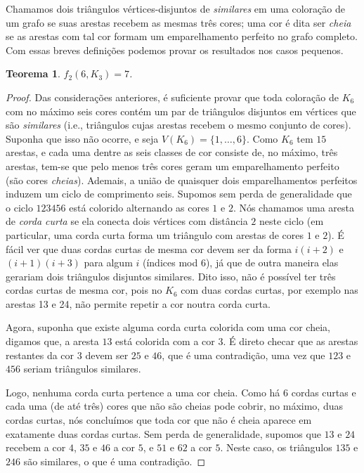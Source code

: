 \documentclass[12pt,a4paper]{book}
\newtheorem{teorema}{Teorema}[chapter]
\begin{document}
Chamamos dois triângulos vértices-disjuntos de \textit{similares} em uma coloração de um grafo se suas arestas recebem as mesmas três cores;  uma cor é dita ser \textit{cheia} se as arestas com tal cor formam um emparelhamento perfeito no grafo completo. 
Com essas breves definições podemos provar os resultados nos casos pequenos.

\begin{teorema}\label{teo:n6K3}
       $f_2(6,K_3)=7$.
\end{teorema}
\begin{proof}
    Das considerações anteriores, é suficiente provar que 
    toda coloração de $K_6$ com no máximo seis cores contém um par de triângulos disjuntos em vértices que são \emph{similares} (i.e., triângulos cujas arestas recebem o mesmo conjunto de cores). 
   Suponha que isso não ocorre, e seja $V(K_6) =\{1,\dots,6\}$.
   Como $K_6$ tem $15$ arestas, e  cada uma dentre as seis classes de cor consiste de, no máximo, três arestas, tem-se que pelo menos três cores geram um emparelhamento perfeito (são cores \emph{cheias}). 
   Ademais, a união de quaisquer dois emparelhamentos perfeitos induzem um ciclo de comprimento seis.
   Supomos sem perda de generalidade que o ciclo $123456$ está colorido alternando as cores $1$ e $2$. 
   Nós chamamos uma aresta de \emph{corda curta} se ela conecta dois vértices com distância $2$ neste ciclo (em particular, uma corda curta forma um triângulo com arestas de cores $1$ e $2$). 
   É fácil ver que duas cordas curtas de mesma cor devem ser da forma $i(i+2)$ e $(i+1)(i+3)$ para algum $i$ (índices mod $6$), já que de outra maneira elas gerariam dois triângulos disjuntos similares.   
   Dito isso, não é possível ter três cordas curtas de mesma cor, pois no $K_6$ com duas cordas curtas, por exemplo nas arestas 13 e 24, não permite repetir a cor noutra corda curta. 
    
    Agora, suponha que existe alguma corda curta colorida com uma cor cheia, digamos que, a aresta $13$ está colorida com a cor $3$. É direto checar que as arestas restantes da cor $3$ devem ser $25$ e $46$, que é uma contradição, uma vez que $123$ e $456$ seriam triângulos similares.  
    
    Logo, nenhuma corda curta pertence a uma cor cheia. Como há $6$ cordas curtas e cada uma (de até três) cores que não são cheias pode cobrir, no máximo, duas cordas curtas, nós concluímos que toda cor que não é cheia aparece em exatamente duas cordas curtas. Sem perda de generalidade, supomos que $13$ e $24$ recebem a cor $4$, $35$ e $46$ a cor $5$, e $51$ e $62$ a cor $5$. Neste caso, os triângulos $135$ e $246$ são similares, o que é uma contradição.
\end{proof}
\end{document}
